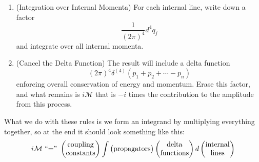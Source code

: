 \begin{enumerate}
\item{(Integration over Internal Momenta)} For each internal line, write down
a factor
\begin{equation*}
\frac{1}{(2\pi)^4}d^{4}q_{j}
\end{equation*}
and integrate over all internal momenta.

\item{(Cancel the Delta Function)} The result will include a delta function
\begin{equation*}
(2\pi)^4\delta^{(4)}(p_1 + p_2 + \cdots - p_n)
\end{equation*}
enforcing overall conservation of energy and momentum. Erase this factor, and
what remains is $i\mathcal{M}$ that is $-i$ times the contribution to the 
amplitude from this process.
\end{enumerate}

What we do with these rules is we form an integrand by multiplying everything
together, so at the end it should look something like this:
\begin{equation}
i\mathcal{M} \textrm{ ``='' } \begin{pmatrix}$coupling$\\
$constants$
\end{pmatrix}
\int
\begin{pmatrix}
$propagators$
\end{pmatrix}
\begin{pmatrix}
$delta$\\ $functions$
\end{pmatrix}d
\begin{pmatrix}
$internal$\\ $lines$
\end{pmatrix}
\end{equation}
